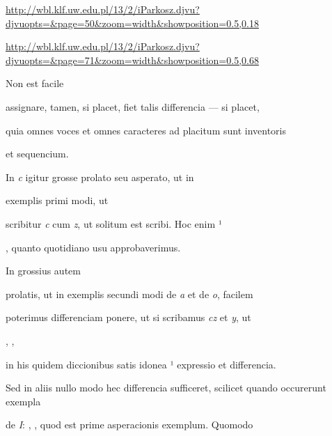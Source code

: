 
\newParkoszpage


{
\url{http://wbl.klf.uw.edu.pl/13/2/iParkosz.djvu?djvuopts=&page=50&zoom=width&showposition=0.5,0.18}

\url{http://wbl.klf.uw.edu.pl/13/2/iParkosz.djvu?djvuopts=&page=71&zoom=width&showposition=0.5,0.68}
}

\bigskip

\obeylines
\mono


\fullpreviouslines


{
\color{blue}
Non est facile 

assignare, tamen, si placet, fiet talis differencia — si placet,

}


\fulllines
quia omnes voces et omnes caracteres ad placitum sunt inventoris

\splitlines
et sequencium.

\indentK In \textit{c} igitur grosse prolato seu asperato, ut in

\fulllines

exemplis primi modi, ut     

scribitur \textit{c} cum \textit{z}, ut solitum est scribi. Hoc enim ¹ 

\splitlines

, quanto quotidiano usu approbaverimus.

\indentK In grossius autem

\fulllines

prolatis, ut in exemplis secundi modi de \textit{a} et de \textit{o}, facilem

poterimus differenciam ponere, ut si scribamus \textit{cz} et \textit{y}, ut 

,     ,

in his quidem diccionibus satis idonea ¹ expressio et differencia.

Sed in aliis nullo modo hec differencia sufficeret, scilicet quando occurerunt exempla

de \textit{I}: , , quod est prime asperacionis exemplum. Quomodo

